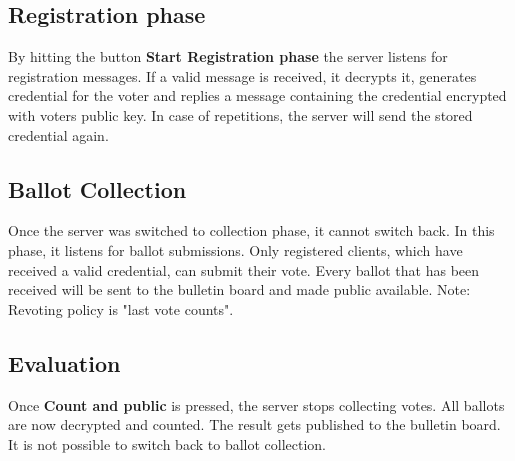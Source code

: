 \documentclass{article}
\begin{document}
\subsection{Registration phase} By hitting the button \textbf{Start Registration phase} the server listens for registration messages. If a valid message is received, it decrypts it, generates credential for the voter and replies a message containing the credential encrypted with voters public key. In case of repetitions, the server will send the stored credential again.
\subsection{Ballot Collection} Once the server was switched to collection phase, it cannot switch back. In this phase, it listens for ballot submissions. Only registered clients, which have received a valid credential, can submit their vote. Every ballot that has been received will be sent to the bulletin board and made public available.
Note: Revoting policy is "last vote counts".
\subsection{Evaluation} Once \textbf{Count and public} is pressed, the server stops collecting votes. All ballots are now decrypted and counted. The result gets published to the bulletin board. It is not possible to switch back to ballot collection.
\end{document}
